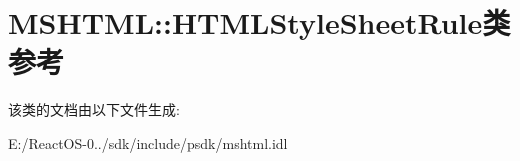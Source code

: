 \hypertarget{class_m_s_h_t_m_l_1_1_h_t_m_l_style_sheet_rule}{}\section{M\+S\+H\+T\+ML\+:\+:H\+T\+M\+L\+Style\+Sheet\+Rule类 参考}
\label{class_m_s_h_t_m_l_1_1_h_t_m_l_style_sheet_rule}


该类的文档由以下文件生成\+:\begin{DoxyCompactItemize}
\item 
E\+:/\+React\+O\+S-\/0../sdk/include/psdk/mshtml.\+idl\end{DoxyCompactItemize}
